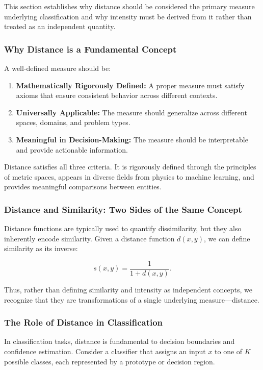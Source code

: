 \documentclass[12pt]{article}
\begin{document}
This section establishes why distance should be considered the primary measure underlying classification and why intensity must be derived from it rather than treated as an independent quantity.

\subsubsection{Why Distance is a Fundamental Concept}

A well-defined measure should be:

\begin{enumerate}
    \item \textbf{Mathematically Rigorously Defined:} A proper measure must satisfy axioms that ensure consistent behavior across different contexts.
    \item \textbf{Universally Applicable:} The measure should generalize across different spaces, domains, and problem types.
    \item \textbf{Meaningful in Decision-Making:} The measure should be interpretable and provide actionable information.
\end{enumerate}

Distance satisfies all three criteria. It is rigorously defined through the principles of metric spaces, appears in diverse fields from physics to machine learning, and provides meaningful comparisons between entities.

\subsubsection{Distance and Similarity: Two Sides of the Same Concept}

Distance functions are typically used to quantify dissimilarity, but they also inherently encode similarity. Given a distance function \( d(x, y) \), we can define similarity as its inverse:

\[
s(x, y) = \frac{1}{1 + d(x, y)}.
\]

Thus, rather than defining similarity and intensity as independent concepts, we recognize that they are transformations of a single underlying measure—distance.

\subsubsection{The Role of Distance in Classification}

In classification tasks, distance is fundamental to decision boundaries and confidence estimation. Consider a classifier that assigns an input \( x \) to one of \( K \) possible classes, each represented by a prototype or decision region.
\end{document}
